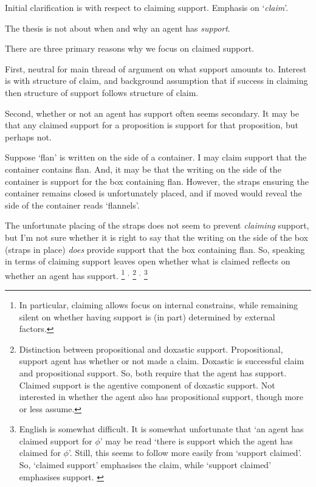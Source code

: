 \begin{note}
  Initial clarification is with respect to claiming support.
  Emphasis on `\emph{claim}'.

  The thesis is not about when and why an agent has \emph{support}.

  There are three primary reasons why we focus on claimed support.

  First, neutral for main thread of argument on what support amounts to.
  Interest is with structure of claim, and background assumption that if success in claiming then structure of support follows structure of claim.

  Second, whether or not an agent has support often seems secondary.
  It may be that any claimed support for a proposition is support for that proposition, but perhaps not.
  \begin{illustration}
    \label{illu:flan-nels}
    Suppose `flan' is written on the side of a container.
    I may claim support that the container contains flan.
    And, it may be that the writing on the side of the container is support for the box containing flan.
    However, the straps ensuring the container remains closed is unfortunately placed, and if moved would reveal the side of the container reads `flannels'.
  \end{illustration}

  The unfortunate placing of the straps does not seem to prevent \emph{claiming} support, but I'm not sure whether it is right to say that the writing on the side of the box (straps in place) \emph{does} provide support that the box containing flan.
  So, speaking in terms of claiming support leaves open whether what is claimed reflects on whether an agent has support.\nolinebreak
  \footnote{
    In particular, claiming allows focus on internal constrains, while remaining silent on whether having support is (in part) determined by external factors.
  }
  \(^{,}\)\nolinebreak
  \footnote{
    Distinction between propositional and doxastic support.
    Propositional, support agent has whether or not made a claim.
    Doxastic is successful claim and propositional support.
    So, both require that the agent has support.
    Claimed support is the agentive component of doxastic support.
    Not interested in whether the agent also has propositional support, though more or less assume.
  }
  \(^{,}\)\nolinebreak
  \footnote{
    {
      \color{red}
      English is somewhat difficult.
      It is somewhat unfortunate that `an agent has claimed support for \(\phi\)' may be read `there is support which the agent has claimed for \(\phi\)'.
      Still, this seems to follow more easily from `support claimed'.
      So, `claimed support' emphasises the claim, while `support claimed' emphasises support.
    }
  }


\end{note}
